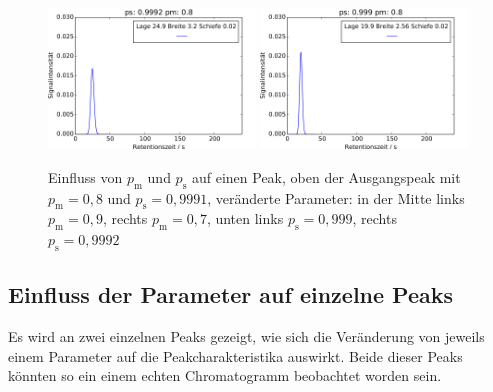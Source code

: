 \begin{figure}[h]
\includegraphics[width=0.49\textwidth]{bilder/2s_einzeleinfluss/2s_t20_psp}
\includegraphics[width=0.49\textwidth]{bilder/2s_einzeleinfluss/2s_t20_psm}
\caption[Einfluss von $p_{\text{m}}$ und $p_{\text{s}}$ auf einen Peak]{Einfluss von $p_{\text{m}}$ und $p_{\text{s}}$ auf einen Peak, oben der Ausgangspeak mit $p_{\text{m}} = 0,8$ und $p_{\text{s}} = 0,9991$, veränderte Parameter: in der Mitte links $p_{\text{m}} = 0,9$, rechts $p_{\text{m}} = 0,7$, unten links $p_{\text{s}} = 0,999$, rechts $p_{\text{s}} = 0,9992$ }
\label{2s_t20_change}
\end{figure}


\subsection{Einfluss der Parameter auf einzelne Peaks}

Es wird an zwei einzelnen Peaks gezeigt, wie sich die Veränderung von jeweils einem Parameter auf die Peakcharakteristika auswirkt. Beide dieser Peaks könnten so ein einem echten Chromatogramm beobachtet worden sein.


